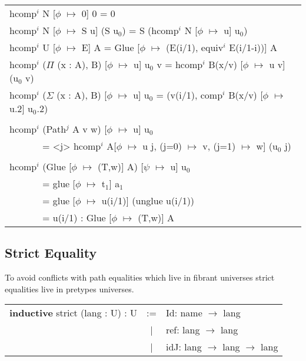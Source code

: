 \documentclass[a4paper,UKenglish,cleveref, autoref, thm-restate]{lipics-v2021}
\newcommand{\tabstyle}[0]{\scriptsize\ttfamily\fontseries{l}\selectfont}
\begin{document}
\begin{table}[ht]
\tabstyle
\begin{tabular}{l}
hcomp$^i$ N [$\phi$ $\mapsto$ 0] 0 = 0 \\
hcomp$^i$ N [$\phi$ $\mapsto$ S u] (S u$_0$) = S (hcomp$^i$ N [$\phi$ $\mapsto$ u] u$_0$) \\
hcomp$^i$ U [$\phi$ $\mapsto$ E] A = Glue [$\phi$ $\mapsto$ (E(i/1), equiv$^i$ E(i/1-i))] A \\
hcomp$^i$ ($\Pi$ (x : A), B) [$\phi$ $\mapsto$ u] u$_0$ v = hcomp$^i$ B(x/v) [$\phi$ $\mapsto$ u v] (u$_0$ v) \\
hcomp$^i$ ($\Sigma$ (x : A), B) [$\phi$ $\mapsto$ u] u$_0$ = (v(i/1), comp$^i$ B(x/v) [$\phi$ $\mapsto$ u.2] u$_0$.2) \\
\\
hcomp$^i$ (Path$^j$ A v w) [$\phi$ $\mapsto$ u] u$_0$ \\
\ \ \ \ \ \ \ = <j> hcomp$^i$ A[$\phi$ $\mapsto$ u j, (j=0) $\mapsto$ v, (j=1) $\mapsto$ w] (u$_0$ j) \\
\\
hcomp$^i$ (Glue [$\phi$ $\mapsto$ (T,w)] A) [$\psi$ $\mapsto$ u] u$_0$ \\
\ \ \ \ \ \ \ = glue [$\phi$ $\mapsto$ t$_1$] a$_1$ \\
\ \ \ \ \ \ \ = glue [$\phi$ $\mapsto$ u(i/1)] (unglue u(i/1)) \\
\ \ \ \ \ \ \ = u(i/1) : Glue [$\phi$ $\mapsto$ (T,w)] A
\end{tabular}
\end{table}

\subsection{Strict Equality}

To avoid conflicts with path equalities which live in fibrant universes strict
equalities live in pretypes universes.

\begin{table}[ht!]
\tabstyle
\begin{tabular}{rcl}
  \textbf{inductive} strict (lang : U) : U & := & Id: name $\rightarrow$ lang \\
  &|& ref: lang $\rightarrow$ lang \\
  &|& idJ: lang $\rightarrow$ lang $\rightarrow$ lang \\
\end{tabular}
\end{table}
\end{document}

